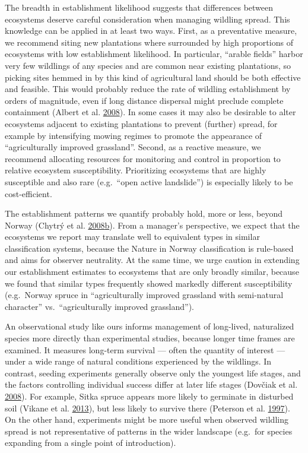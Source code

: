 \documentclass[
]{article}
\begin{document}
The breadth in establishment likelihood suggests that differences between ecosystems deserve careful consideration when managing wildling spread.
This knowledge can be applied in at least two ways.
First, as a preventative measure, we recommend siting new plantations where surrounded by high proportions of ecosystems with low establishment likelihood.
In particular, ``arable fields'' harbor very few wildlings of any species and are common near existing plantations, so picking sites hemmed in by this kind of agricultural land should be both effective and feasible.
This would probably reduce the rate of wildling establishment by orders of magnitude, even if long distance dispersal might preclude complete containment (Albert et al. \protect\hyperlink{ref-albertLanduseChangeSubalpine2008}{2008}).
In some cases it may also be desirable to alter ecosystems adjacent to existing plantations to prevent (further) spread, for example by intensifying mowing regimes to promote the appearance of ``agriculturally improved grassland''.
Second, as a reactive measure, we recommend allocating resources for monitoring and control in proportion to relative ecosystem susceptibility.
Prioritizing ecosystems that are highly susceptible and also rare (e.g.~``open active landslide'') is especially likely to be cost-efficient.

The establishment patterns we quantify probably hold, more or less, beyond Norway (Chytrý et al. \protect\hyperlink{ref-chytryHabitatInvasionsAlien2008}{2008}\protect\hyperlink{ref-chytryHabitatInvasionsAlien2008}{b}).
From a manager's perspective, we expect that the ecosystems we report may translate well to equivalent types in similar classification systems, because the Nature in Norway classification is rule-based and aims for observer neutrality.
At the same time, we urge caution in extending our establishment estimates to ecosystems that are only broadly similar, because we found that similar types frequently showed markedly different susceptibility (e.g.~Norway spruce in ``agriculturally improved grassland with semi-natural character'' vs.~``agriculturally improved grassland'').

An observational study like ours informs management of long-lived, naturalized species more directly than experimental studies, because longer time frames are examined.
It measures long-term survival --- often the quantity of interest --- under a wide range of natural conditions experienced by the wildlings.
In contrast, seeding experiments generally observe only the youngest life stages, and the factors controlling individual success differ at later life stages (Dovčiak et al. \protect\hyperlink{ref-dovciakSeedRainEnvironmental2008}{2008}).
For example, Sitka spruce appears more likely to germinate in disturbed soil (Vikane et al. \protect\hyperlink{ref-vikaneInvasionCallunaHeath2013}{2013}), but less likely to survive there (Peterson et al. \protect\hyperlink{ref-petersonEcologyManagementSitka1997}{1997}).
On the other hand, experiments might be more useful when observed wildling spread is not representative of patterns in the wider landscape (e.g.~for species expanding from a single point of introduction).
\end{document}
